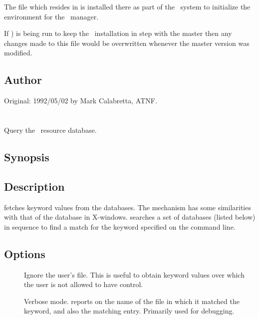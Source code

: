 The  file which resides in  is installed there as
part of the \aipspp\ system to initialize the  environment for the
\aipspp\ manager.

If ) is being run to keep the \aipspp\ installation in step
with the master then any changes made to this file would be overwritten
whenever the master version was modified.

\subsection*{Author}

Original: 1992/05/02 by Mark Calabretta, ATNF.


\newpage
\section{}
\label{getrc}

Query the \aipspp\ resource database.

\subsection*{Synopsis}

\begin{synopsis}
\end{synopsis}

\subsection*{Description}

 fetches keyword values from the  databases.  The
mechanism has some similarities with that of the  database in
X-windows.   searches a set of  databases (listed
below) in sequence to find a match for the keyword specified on the command
line.

\subsection*{Options}

\begin{description}
\item[]
   Ignore the user's  file.  This is useful to obtain keyword
   values over which the user is not allowed to have control.

\item[]
   Verbose mode.   reports on  the name of the file in
   which it matched the keyword, and also the matching entry.  Primarily used
   for debugging.
\end{description}

